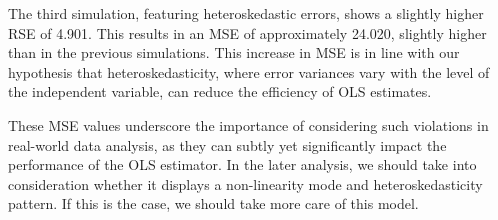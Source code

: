 \documentclass[12pt]{article}
\numberwithin{figure}{section}
\begin{document}
The third simulation, featuring heteroskedastic errors, shows a slightly higher RSE of 4.901. This results in an MSE of approximately 24.020, slightly higher than in the previous simulations. This increase in MSE is in line with our hypothesis that heteroskedasticity, where error variances vary with the level of the independent variable, can reduce the efficiency of OLS estimates. 

These MSE values underscore the importance of considering such violations in real-world data analysis, as they can subtly yet significantly impact the performance of the OLS estimator. In the later analysis, we should take into consideration whether it displays a non-linearity mode and heteroskedasticity pattern. If this is the case, we should take more care of this model. 





\end{document}
